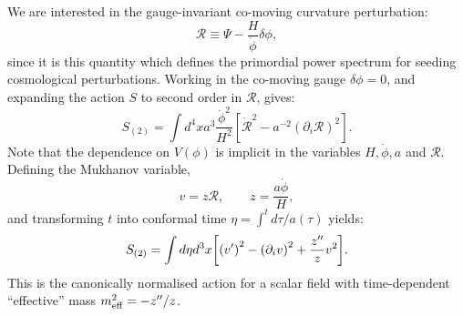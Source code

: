 We are interested in the gauge-invariant co-moving curvature perturbation:
\begin{equation}
  \mathcal{R}\equiv \Psi - \frac{H}{\dot{\phi}}\delta\phi,
  \label{eqn:R_action}
\end{equation}
since it is this quantity which defines the primordial power spectrum for seeding cosmological perturbations. Working in the co-moving gauge $\delta\phi=0$, and expanding the action $S$ to second order in $\mathcal{R}$, gives:
\begin{equation}
  S_{(2)} =  \int d^4 x a^3\frac{\dot{\phi}^2}{H^2}{\left[ \dot{\mathcal{R}}^2 - a^{-2} {\left( \partial_i\mathcal{R} \right)}^2 \right]}.
  \label{eqn:R_action}
\end{equation}
Note that the dependence on $V(\phi)$ is implicit in the variables $H,\dot{\phi},a$ and $\mathcal{R}$.
Defining the Mukhanov variable,
\begin{equation}
  v = z\mathcal{R},\qquad z=\frac{a\dot{\phi}}{H},
  \label{eqn:mukhanov_variable}
\end{equation}
and transforming $t$ into conformal time $\eta = \int^t d\tau/a(\tau) $ yields:
\begin{equation}                                 
  S_{(2)} =  \int d\eta d^3x {\left[ {\left( {{v}^\prime} \right)}^2 - {\left( \partial_iv \right)}^2 + \frac{{{z}^{\prime\prime}}}{z} v^2 \right]}.
  \label{eqn:v_action}
\end{equation}
This is the canonically normalised action for a scalar field with time-dependent ``effective'' mass $m_\mathrm{eff}^2 = -{{z}^{\prime\prime}}/z$.

